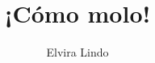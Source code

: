\documentclass[fontsize=11pt]{scrartcl}
\begin{document}
\title{¡Cómo molo!}
\author{Elvira Lindo}
\date{}

\maketitle
\clearpage

\parskip0pt


\newcommand{\sidenote}[1]{\marginpar[#1]{\small\textit{#1}}}
\newcommand{\grammarnote}[1]{\marginpar[#1]{\footnotesize{G#1}}}
\newcommand{\ul}[1]{\underline{#1}}
\newcommand{\nwfootnote}[1]{\footnote{#1}}
\newcommand{\fillmiss}{\rule{2cm}{0.4pt}~}
\newcommand{\choice}{$\Box$}
\newcommand{\correctchoice}{\framebox[1em]{\ding{51}}}
\newcommand{\falsechoice}{\framebox[1em]{\ding{53}}}
\newcommand{\correction}[1]{~\ding{43}~\textbf{\textsl{#1}}}
\newcommand{\FIN}{\textbf{--- FIN ---}\clearpage}

\newcommand{\mdash}{-}



\setlength{\parindent}{0em}

\raggedright

\end{document}
